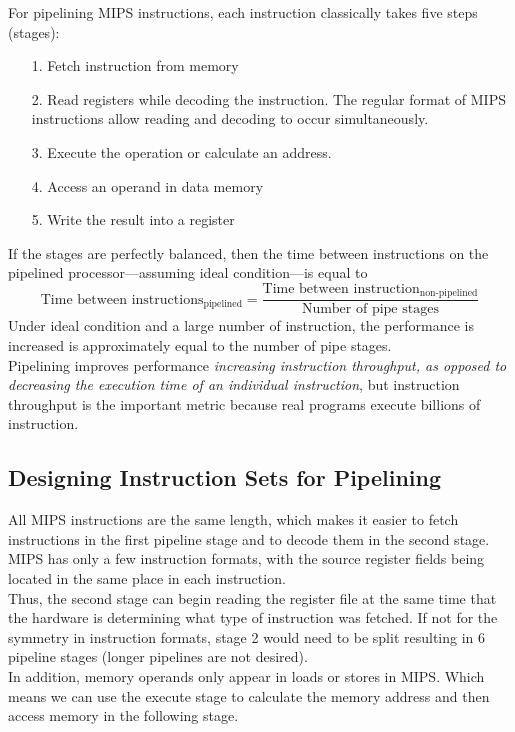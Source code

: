 \documentclass[12pt]{article}
\theoremstyle{definition}
\begin{document}
  For pipelining MIPS instructions, each instruction classically takes five steps (stages):
  \begin{itemize}
    \item[1.] Fetch instruction from memory
    \item[2.] Read registers while decoding the instruction. The regular format of MIPS instructions allow reading and decoding to occur simultaneously.
    \item[3.] Execute the operation or calculate an address.
    \item[4.] Access an operand in data memory
    \item[5.] Write the result into a register
  \end{itemize}
  If the stages are perfectly balanced, then the time between instructions on the pipelined processor---assuming ideal condition---is equal to
  $$\text{Time between instructions}_\text{pipelined} = \frac{\text{Time between instruction}_\text{non-pipelined}}{\text{Number of pipe stages}}$$
  Under ideal condition and a large number of instruction, the performance is increased is approximately equal to the number of pipe stages. \\

  Pipelining improves performance \emph{increasing instruction throughput, as opposed to decreasing the execution time of an individual instruction}, but instruction throughput is the important metric because real programs execute billions of instruction.

  \subsection{Designing Instruction Sets for Pipelining}
  All MIPS instructions are the same length, which makes it easier to fetch instructions in the first pipeline stage and to decode them in the second stage. \\
  MIPS has only a few instruction formats, with the source register fields being located in the same place in each instruction. \\
  Thus, the second stage can begin reading the register file at the same time that the hardware is determining what type of instruction was fetched.
  If not for the symmetry in instruction formats, stage 2 would need to be split resulting in 6 pipeline stages (longer pipelines are not desired). \\
  In addition, memory operands only appear in loads or stores in MIPS.
  Which means we can use the execute stage to calculate the memory address and then access memory in the following stage.
\end{document}
